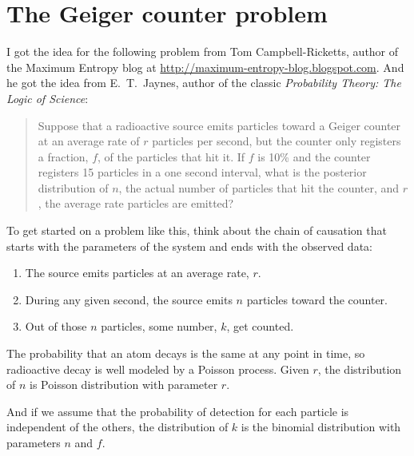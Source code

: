 \documentclass[12pt]{book}
\theoremstyle{exercise}
\begin{document}
\section{The Geiger counter problem}

I got the idea for the following problem from Tom Campbell-Ricketts,
author of the Maximum Entropy blog at
\url{http://maximum-entropy-blog.blogspot.com}.  And he got the idea
from E.~T.~Jaynes, author of the classic {\em Probability Theory: The
  Logic of Science}:

\begin{quote}
Suppose that a radioactive source emits particles toward
a Geiger counter at an average rate of $r$ particles per second,
but the counter only registers a fraction, $f$, of the particles
that hit it.  If $f$ is 10\% and
the counter registers 15 particles in a one second
interval, what is the posterior distribution of $n$, the actual
number of particles that hit the counter, and $r$, the average
rate particles are emitted?
\end{quote}

To get started on a problem like this, think about the chain of
causation that starts with the parameters of the system and ends
with the observed data:

\begin{enumerate}

\item The source emits particles at an average rate, $r$.

\item During any given second, the source emits $n$ particles
toward the counter.

\item Out of those $n$ particles, some number, $k$, get counted.

\end{enumerate}

The probability that an atom decays is the same at any point in time,
so radioactive decay is well modeled by a Poisson process.  Given $r$,
the distribution of $n$ is Poisson distribution with parameter $r$.

And if we assume that the probability of detection for each particle
is independent of the others, the distribution of $k$ is the binomial
distribution with parameters $n$ and $f$.
\end{document}
